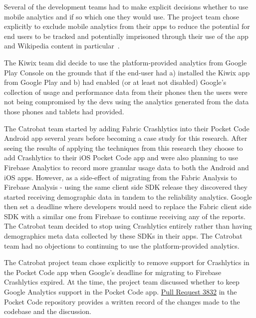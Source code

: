 Several of the development teams had to make explicit decisions whether to use mobile analytics and if so which one they would use. The  project team chose explicitly to exclude mobile analytics from their apps to reduce the potential for end users to be tracked and potentially imprisoned through their use of the app and Wikipedia content in particular~.

The Kiwix team did decide to use the platform-provided analytics from Google Play Console on the grounds that if the end-user had a) installed the Kiwix app from Google Play and b) had enabled (or at least not disabled) Google's collection of usage and performance data from their phones then the users were not being compromised by the devs using the analytics generated from the data those phones and tablets had provided.

The Catrobat team started by adding Fabric Crashlytics into their Pocket Code Android app several years before becoming a case study for this research. After seeing the results of applying the techniques from this research they choose to add Crashlytics to their iOS Pocket Code app and were also planning to use Firebase Analytics to record more granular usage data to both the Android and iOS apps. However, as a side-effect of migrating from the Fabric Analysis to Firebase Analysis - using the same client side SDK release they discovered they started receiving demographic data in tandem to the reliability analytics. Google then set a deadline where developers would need to replace the Fabric client side SDK with a similar one from Firebase to continue receiving any of the reports. The Catrobat team decided to stop using Crashlytics entirely rather than having demographics meta data collected by these SDKs in their apps. The Catrobat team had no objections to continuing to use the platform-provided analytics.

 The Catrobat project team chose explicitly to remove support for Crashlytics in the Pocket Code app when Google's deadline for migrating to Firebase Crashlytics expired. At the time, the project team discussed whether to keep Google Analytics support in the Pocket Code app.  
\href{https://github.com/Catrobat/Catroid/pull/3832}{Pull Request 3832} in the Pocket Code repository provides a written record of the changes made to the codebase and the discussion.



